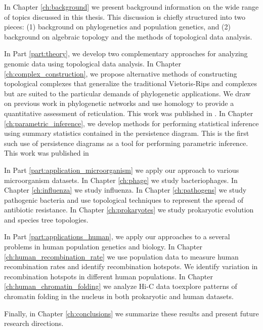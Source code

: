 In Chapter \ref{ch:background} we present background information on the wide range of topics discussed in this thesis.
This discussion is chiefly structured into two pieces: (1) background on phylogenetics and population genetics, and (2) background on algebraic topology and the methods of topological data analysis.

In Part \ref{part:theory}, we develop two complementary approaches for analyzing genomic data using topological data analysis.
In Chapter \ref{ch:complex_construction}, we propose alternative methods of constructing topological complexes that generalize the traditional Vietoris-Rips and \Cech complexes but are suited to the particular demands of phylogenetic applications.
We draw on previous work in phylogenetic networks and use homology to provide a quantitative assessment of reticulation.
This work was published in \cite{Emmett:2015a}.
In Chapter \ref{ch:parametric_inference}, we develop methods for performing statistical inference using summary statistics contained in the persistence diagram.
This is the first such use of persistence diagrams as a tool for performing parametric inference. This work was published in \cite{Emmett:2014b}

In Part \ref{part:application_microorganism} we apply our approach to various microorganism datasets.
In Chapter \ref{ch:phage} we study bacteriophages.
In Chapter \ref{ch:influenza} we study influenza.
In Chapter \ref{ch:pathogens} we study pathogenic bacteria and use topological techniques to represent the spread of antibiotic resistance.
In Chapter \ref{ch:prokaryotes} we study prokaryotic evolution and species tree topologies.

In Part \ref{part:applications_human}, we apply our approaches to a several problems in human population genetics and biology.
In Chapter \ref{ch:human_recombination_rate} we use population data to measure human recombination rates and identify recombination hotspots.
We identify variation in recombination hotspots in different human populations.
In Chapter \ref{ch:human_chromatin_folding} we analyze Hi-C data toexplore patterns of chromatin folding in the nucleus in both prokaryotic and human datasets.

Finally, in Chapter \ref{ch:conclusions} we summarize these results and present future research directions.

